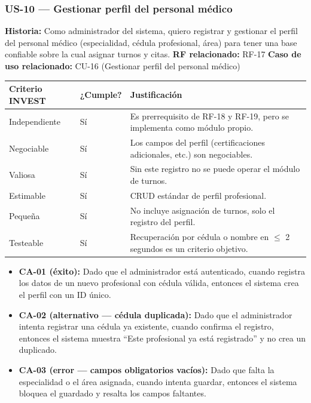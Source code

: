 \documentclass[11pt,a4paper]{article}
\providecommand{\tightlist}{%
	\setlength{\itemsep}{0pt}\setlength{\parskip}{0pt}}
\begin{document}
	\subsubsection{US-10 --- Gestionar perfil del personal médico}
	
	\textbf{Historia:} Como administrador del sistema, quiero registrar y gestionar el perfil del personal médico (especialidad, cédula profesional, área) para tener una base confiable sobre la cual asignar turnos y citas.
	\textbf{RF relacionado:} RF-17
	\textbf{Caso de uso relacionado:} CU-16 (Gestionar perfil del personal médico)
	
	\begin{longtable}{p{} p{} p{}}
		
		
		\toprule
		\textbf{Criterio INVEST} &
		\textbf{¿Cumple?} &
		\textbf{Justificación} \\
		\midrule
		\endhead
		
		Independiente & Sí & Es prerrequisito de RF-18 y RF-19, pero se implementa como módulo propio. \\
		Negociable & Sí & Los campos del perfil (certificaciones adicionales, etc.) son negociables. \\
		Valiosa & Sí & Sin este registro no se puede operar el módulo de turnos. \\
		Estimable & Sí & CRUD estándar de perfil profesional. \\
		Pequeña & Sí & No incluye asignación de turnos, solo el registro del perfil. \\
		Testeable & Sí & Recuperación por cédula o nombre en \(\leq\) 2 segundos es un criterio objetivo. \\
		
		\bottomrule
	\end{longtable}
	
	\begin{itemize}
		\tightlist
		\item
		\textbf{CA-01 (éxito):} Dado que el administrador está autenticado, cuando registra los datos de un nuevo profesional con cédula válida, entonces el sistema crea el perfil con un ID único.
		\item
		\textbf{CA-02 (alternativo --- cédula duplicada):} Dado que el administrador intenta registrar una cédula ya existente, cuando confirma el registro, entonces el sistema muestra ``Este profesional ya está registrado'' y no crea un duplicado.
		\item
		\textbf{CA-03 (error --- campos obligatorios vacíos):} Dado que falta la especialidad o el área asignada, cuando intenta guardar, entonces el sistema bloquea el guardado y resalta los campos faltantes.
	\end{itemize}
	
\end{document}
